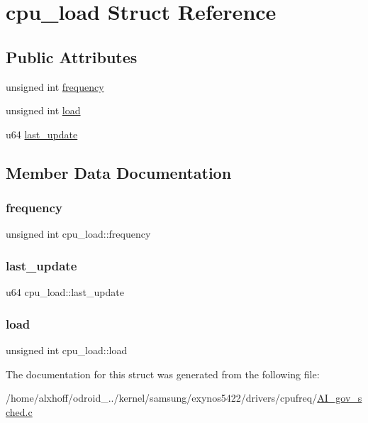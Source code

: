 \hypertarget{structcpu__load}{}\section{cpu\+\_\+load Struct Reference}
\label{structcpu__load}
\subsection*{Public Attributes}
\begin{DoxyCompactItemize}
\item 
unsigned int \hyperlink{structcpu__load_af654d573ce86529e3107252df3a22452}{frequency}
\item 
unsigned int \hyperlink{structcpu__load_a2a531bea8203e55d003a8434eff8160c}{load}
\item 
u64 \hyperlink{structcpu__load_a06087521f21fa37d986d061d92f74b37}{last\+\_\+update}
\end{DoxyCompactItemize}


\subsection{Member Data Documentation}
\mbox{\label{structcpu__load_af654d573ce86529e3107252df3a22452}} 
\subsubsection{\texorpdfstring{frequency}{frequency}}
{\footnotesize\ttfamily unsigned int cpu\+\_\+load\+::frequency}

\mbox{\label{structcpu__load_a06087521f21fa37d986d061d92f74b37}} 
\subsubsection{\texorpdfstring{last\+\_\+update}{last\_update}}
{\footnotesize\ttfamily u64 cpu\+\_\+load\+::last\+\_\+update}

\mbox{\label{structcpu__load_a2a531bea8203e55d003a8434eff8160c}} 
\subsubsection{\texorpdfstring{load}{load}}
{\footnotesize\ttfamily unsigned int cpu\+\_\+load\+::load}



The documentation for this struct was generated from the following file\+:\begin{DoxyCompactItemize}
\item 
/home/alxhoff/odroid\+\_../kernel/samsung/exynos5422/drivers/cpufreq/\hyperlink{AI__gov__sched_8c}{A\+I\+\_\+gov\+\_\+sched.\+c}\end{DoxyCompactItemize}
